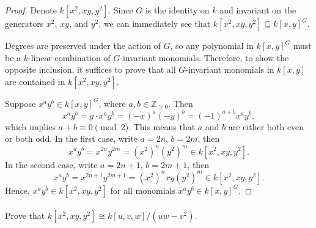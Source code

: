 \documentclass[12pt]{article}
\newlength{\myparskip}
\newenvironment{fullbox}{\begin{lrbox}{\savefullbox}\begin{minipage}{\dimexpr\textwidth-2\fboxsep\relax}\setlength{\parskip}{\myparskip}}{\end{minipage}\end{lrbox}\framebox[\textwidth]{\usebox{\savefullbox}}}
\newenvironment{pbox}[1][]{\begin{fullbox}\ifx#1\empty\else\paragraph{#1}\fi}{\end{fullbox}}
\newcommand{\Z}{\mathbb{Z}}
\newcommand{\<}{\langle}
\renewcommand{\>}{\rangle}
\newcommand{\isom}{\cong}
\begin{document}
\begin{proof}
    Denote $k[x^2, xy, y^2]$. Since $G$ is the identity on $k$ and invariant on the generators $x^2$, $xy$, and $y^2$, we can immediately see that $k[x^2, xy, y^2] \subseteq k[x, y]^G$.

    Degrees are preserved under the action of $G$, so any polynomial in $k[x, y]^G$ must be a $k$-linear combination of $G$-invariant monomials. Therefore, to show the opposite inclusion, it suffices to prove that all $G$-invariant monomials in $k[x, y]$ are contained in $k[x^2, xy, y^2]$.

    Suppose $x^ay^b \in k[x, y]^G$, where $a, b \in \Z_{\geq 0}$. Then
    \[
        x^ay^b 
            = g \cdot x^ay^b
            = (-x)^a(-y)^b
            = (-1)^{a + b}x^ay^b,
    \]
    which implies $a + b \equiv 0 \pmod{2}$. This means that $a$ and $b$ are either both even or both odd. In the first case, write $a = 2n$, $b = 2m$, then
    \[
        x^ay^b
            = x^{2n}y^{2m}
            = (x^2)^n(y^2)^m
            \in k[x^2, xy, y^2].
    \]
    In the second case, write $a = 2n + 1$, $b = 2m + 1$, then
    \[
        x^ay^b
            = x^{2n+1}y^{2m+1}
            = (x^2)^nxy(y^2)^m
            \in k[x^2, xy, y^2].
    \]
    Hence, $x^ay^b \in k[x^2, xy, y^2]$ for all monomials $x^ay^b \in k[x, y]^G$.

\end{proof}

\begin{pbox}
    Prove that $k[x^2, xy, y^2] \isom k[u, v, w] / (uw - v^2)$.
\end{pbox}
\end{document}
